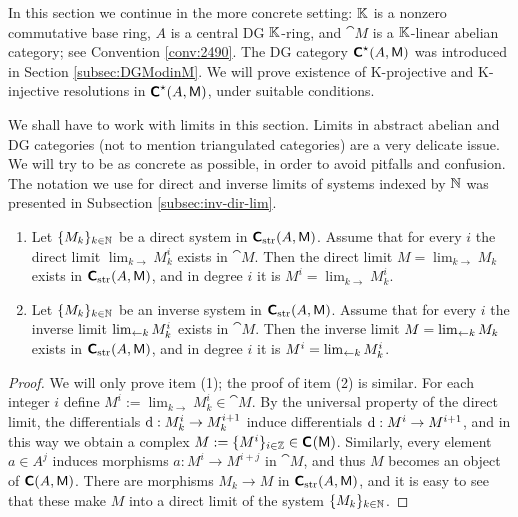 \AYcopyright
 
In this section we continue in the more concrete setting: 
$\mathbb{K}$ is a nonzero commutative base ring, $A$ is a central DG $\mathbb{K}$-ring, 
and $\cat{M}$ is a $\mathbb{K}$-linear abelian category; see Convention \ref{conv:2490}.
The DG category $\boldsymbol{\mathsf{C}}^{\star}(A, \operatorname{\mathsf{M}})$
was introduced in Section \ref{subsec:DGModinM}. 
We will prove existence of  K-projective and K-injective resolutions in 
$\boldsymbol{\mathsf{C}}^{\star}(A, \operatorname{\mathsf{M}})$,
under suitable conditions.  


\label{subsec:lims-cplx}
We shall have to work with limits in this section. Limits in abstract abelian 
and DG categories (not to mention triangulated categories) are a very 
delicate issue. We will try to be as concrete as possible, in order to avoid 
pitfalls and confusion. The notation we use for direct and inverse limits
of systems indexed by $\mathbb{N}$ was presented in Subsection \ref{subsec:inv-dir-lim}.
 
\begin{prop} \label{prop:1660} \mbox{}
\begin{enumerate}
\item Let $\{ M_k \}_{k \in \mathbb{N}}$ be a direct system in 
$\boldsymbol{\mathsf{C}}_{\mathrm{str}}(A, \operatorname{\mathsf{M}})$. Assume that for every $i$ the direct limit 
$\lim_{k \to} M^i_k$ exists in $\cat{M}$. Then 
the direct limit 
$M = \lim_{k \to} M_k$ exists in $\boldsymbol{\mathsf{C}}_{\mathrm{str}}(A, \operatorname{\mathsf{M}})$, and in 
degree $i$ it is $M^i = \lim_{k \to} M^i_k$.

\item Let $\{ M_k \}_{k \in \mathbb{N}}$ be an inverse system in 
$\boldsymbol{\mathsf{C}}_{\mathrm{str}}(A, \operatorname{\mathsf{M}})$. Assume that for every $i$ the inverse limit 
$\lim_{\leftarrow k} M^i_k$ exists in $\cat{M}$. Then 
the inverse limit 
$M = \lim_{\leftarrow k} M_k$ exists in $\boldsymbol{\mathsf{C}}_{\mathrm{str}}(A, \operatorname{\mathsf{M}})$, and in 
degree $i$ it is $M^i = \lim_{\leftarrow k} M^i_k$.
\end{enumerate}
\end{prop}

\begin{proof}
We will only prove item (1); the proof of item (2) is similar. 
For each integer $i$ define 
$M^i := \lim_{k \to} M^i_k \in \cat{M}$. 
By the universal property of the direct limit, the differentials 
$\mathrm{d} : M^i_k \to M^{i + 1}_k$ induce differentials 
$\mathrm{d} : M^i \to M^{i + 1}$, and in this way we obtain a complex 
$M := \{ M^i \}_{i \in \mathbb{Z}} \in \boldsymbol{\mathsf{C}}_{}(\operatorname{\mathsf{M}})$.
Similarly, every element $a \in A^j$ induces morphisms 
$a : M^i \to M^{i + j}$ in $\cat{M}$, and thus $M$ becomes an object of 
$\boldsymbol{\mathsf{C}}(A, \operatorname{\mathsf{M}})$. There are morphisms $M_k \to M$ in 
$\boldsymbol{\mathsf{C}}_{\mathrm{str}}(A, \operatorname{\mathsf{M}})$, and it is easy to see that these make $M$ 
into a direct limit of the system $\{ M_k \}_{k \in \mathbb{N}}$.
\end{proof}

